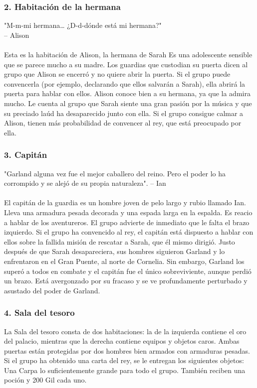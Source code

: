 \subsubsection*{2. Habitación de la hermana}
"M-m-mi hermana… ¿D-d-dónde está mi hermana?"\\
\indent -- Alison\\\\
Esta es la habitación de Alison, la hermana de Sarah Es una adolescente sensible que se parece mucho a su madre. Los guardias que custodian su puerta dicen al grupo que Alison se encerró y no quiere abrir la puerta. Si el grupo puede convencerla (por ejemplo, declarando que ellos salvarán a Sarah), ella abrirá la puerta para hablar con ellos. Alison conoce bien a su hermana, ya que la admira mucho. Le cuenta al grupo que Sarah siente una gran pasión por la música y que su preciado laúd ha desaparecido junto con ella. Si el grupo consigue calmar a Alison, tienen más probabilidad de convencer al rey, que está preocupado por ella. 

\subsubsection*{3. Capitán}
"Garland alguna vez fue el mejor caballero del reino. Pero el poder lo ha corrompido y se alejó de su propia naturaleza".
\indent -- Ian \\\\
El capitán de la guardia es un hombre joven de pelo largo y rubio llamado Ian. Lleva una armadura pesada decorada y una espada larga en la espalda. Es reacio a hablar de los aventureros. El grupo advierte de inmediato que le falta el brazo izquierdo. Si el grupo ha convencido al rey, el capitán está dispuesto a hablar con ellos sobre la fallida misión de rescatar a Sarah, que él mismo dirigió. Justo después de que Sarah desapareciera, sus hombres siguieron Garland y lo enfrentaron en el Gran Puente, al norte de Cornelia. Sin embargo, Garland los superó a todos en combate y el capitán fue el único sobreviviente, aunque perdió un brazo. Está avergonzado por su fracaso y se ve profundamente perturbado y asustado del poder de Garland. 

\subsubsection*{4. Sala del tesoro}
La Sala del tesoro consta de dos habitaciones: la de la izquierda contiene el oro del palacio, mientras que la derecha contiene equipos y objetos caros. Ambas puertas están protegidas por dos hombres bien armados con armaduras pesadas. Si el grupo ha obtenido una carta del rey, se le entregan los siguientes objetos: Una Carpa lo suficientemente grande para todo el grupo. También reciben una poción y 200 Gil cada uno. 


